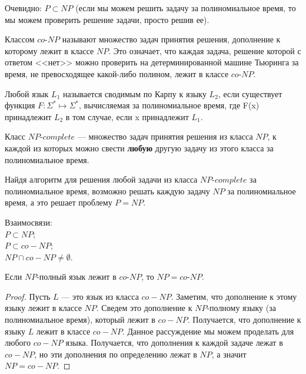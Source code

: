     \begin{Rem}
        Очевидно: $P \subset NP$ (если мы можем решить задачу за полиномиальное время, то мы можем проверить решение задачи, просто решив ее).
    \end{Rem}
    \begin{Def}
        Классом $co$-$NP$ называют множество задач принятия решения, дополнение к которому лежит в классе $NP$. Это означает, что каждая задача, решение которой с ответом <<нет>> можно проверить на детерминированной машине Тьюринга за время, не превосходящее какой-либо полином, лежит в классе $co$-$NP$.
    \end{Def}
    
    
    \begin{Def}
        Любой язык $L_1$ называется сводимым по Карпу к языку $L_2$, если существует функция $F\colon \Sigma ^{*}\mapsto \Sigma ^{*}$, вычисляемая за полиномиальное время, где F(x) принадлежит $L_2$ в том случае, если x принадлежит $L_1$. 
    \end{Def}
    \begin{Def}
        Класс $NP$-$complete$ --- множество задач принятия решения из класса $NP$, к каждой из которых можно свести \textbf{любую} другую задачу из этого класса за полиномиальное время.
    \end{Def}
    \begin{Rem}
        Найдя алгоритм для решения любой задачи из класса $NP$-$complete$ за полиномиальное время, возможно решать каждую задачу $NP$ за полиномиальное время, а это решает проблему $P=NP$.
    \end{Rem}
    
    
    \begin{Rem}
        Взаимосвязи:\\
        $P \subset NP$;\\
        $P \subset co-NP$;\\
        $NP \cap co-NP \neq \emptyset$.
    \end{Rem}
    
        
    \begin{Thm}
    Если $NP$-полный язык лежит в $co$-$NP$, то $NP = co$-$NP$.
    \end{Thm}
    \begin{proof}
    Пусть $L$ --- это язык из класса $co-NP$. Заметим, что дополнение к этому языку лежит в классе $NP$. Сведем это дополнение к $NP$-полному языку (за полиномиальное время), который лежит в $co-NP$. Получается, что дополнение к языку $L$ лежит в классе $co-NP$. Данное рассуждение мы можем проделать для любого $co-NP$ языка. Получается, что дополнения к каждой задаче лежат в $co-NP$, но эти дополнения по определению лежат в $NP$, а значит $NP = co-NP$.
    \end{proof}

